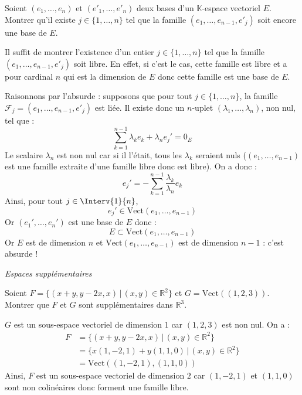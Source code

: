 \documentclass[a4paper,10pt]{report}
\begin{document}
\medskip

\begin{Exercice}{} Soient $(e_1 , \ldots ,e_n)$ et $(e'_1 , \ldots ,e'_n)$ deux bases d'un $\mathbb{K}$-espace vectoriel $E$. Montrer qu'il existe $j \in \lbrace 1, \ldots ,n \rbrace$ tel que la famille $(e_1 , \ldots ,e_{n - 1} ,e'_j)$ soit encore une base de $E$.
\end{Exercice}

\corr Il suffit de montrer l'existence d'un entier $j \in \lbrace 1, \ldots ,n \rbrace$ tel que la famille $(e_1 , \ldots ,e_{n - 1} ,e'_j)$ soit libre. En effet, si c'est le cas, cette famille est libre et a pour cardinal $n$ qui est la dimension de $E$ donc cette famille est une base de $E$.

\medskip

\noindent Raisonnons par l'absurde : supposons que pour tout $j \in \lbrace 1, \ldots ,n \rbrace$, la famille $\mathcal{F}_j=(e_1 , \ldots ,e_{n - 1} ,e'_j)$ est liée. Il existe donc un $n$-uplet $(\lambda_1, \ldots, \lambda_n)$, non nul, tel que :
$$ \sum_{k=1}^{n-1} \lambda_k e_k + \lambda_n e_j' = 0_E$$
Le scalaire $\lambda_n$ est non nul car si il l'était, tous les $\lambda_k$ seraient nuls ($(e_1, \ldots, e_{n-1})$ est une famille extraite d'une famille libre donc est libre). On a donc :
$$ e_j' = - \sum_{k=1}^{n-1} \dfrac{\lambda_k}{\lambda_n} e_k$$
Ainsi, pour tout $j \in \Interv{1}{n}$,
$$ e_j' \in \textrm{Vect}(e_1, \ldots, e_{n-1})$$
Or $(e_1', \ldots, e_n')$ est une base de $E$ donc :
$$ E \subset \textrm{Vect}(e_1, \ldots, e_{n-1})$$
Or $E$ est de dimension $n$ et $\textrm{Vect}(e_1, \ldots, e_{n-1})$ est de dimension $n-1$ : c'est absurde !

\medskip



\begin{center}
\textit{{ {\large Espaces supplémentaires}}}
\end{center}

\medskip

\begin{Exercice}{} Soient $F= \lbrace (x+y,y-2x, x) \, \vert \,  (x,y) \in \mathbb{R}^2 \rbrace$ et $G = \textrm{Vect}((1,2,3))$. Montrer que $F$ et $G$ sont supplémentaires dans $\mathbb{R}^3$.
\end{Exercice} 

\corr $G$ est un sous-espace vectoriel de dimension $1$ car $(1,2,3)$ est non nul. On a :
\begin{align*}
F & = \lbrace (x+y,y-2x, x) \, \vert \,  (x,y) \in \mathbb{R}^2 \rbrace \\
& = \lbrace x (1,-2,1) + y (1,1,0) \, \vert \, (x,y) \in \mathbb{R}^2 \rbrace \\
& = \textrm{Vect}((1,-2,1),(1,1,0)) 
\end{align*}
Ainsi, $F$ est un sous-espace vectoriel de dimension $2$ car $(1,-2,1)$ et $(1,1,0)$ sont non colinéaires donc forment une famille libre.
\end{document}
